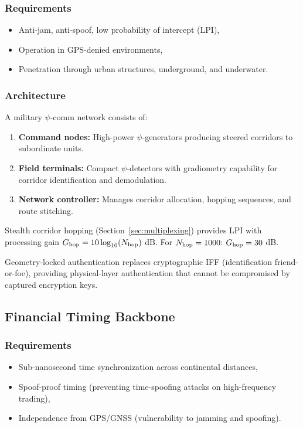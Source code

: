 \documentclass[twocolumn,superscriptaddress,prd,nofootinbib]{revtex4-2}
\begin{document}
\subsubsection{Requirements}

\begin{itemize}
\item Anti-jam, anti-spoof, low probability of intercept (LPI),
\item Operation in GPS-denied environments,
\item Penetration through urban structures, underground, and underwater.
\end{itemize}

\subsubsection{Architecture}

A military $\psi$-comm network consists of:
\begin{enumerate}
\item \textbf{Command nodes:} High-power $\psi$-generators producing
steered corridors to subordinate units.
\item \textbf{Field terminals:} Compact $\psi$-detectors with
gradiometry capability for corridor identification and demodulation.
\item \textbf{Network controller:} Manages corridor allocation, hopping
sequences, and route stitching.
\end{enumerate}

Stealth corridor hopping (Section~\ref{sec:multiplexing}) provides LPI
with processing gain $G_{\rm hop} = 10\log_{10}(N_{\rm hop})$ dB.
For $N_{\rm hop} = 1000$: $G_{\rm hop} = 30$ dB.

Geometry-locked authentication replaces cryptographic IFF
(identification friend-or-foe), providing physical-layer authentication
that cannot be compromised by captured encryption keys.

\subsection{Financial Timing Backbone}

\subsubsection{Requirements}

\begin{itemize}
\item Sub-nanosecond time synchronization across continental distances,
\item Spoof-proof timing (preventing time-spoofing attacks on
high-frequency trading),
\item Independence from GPS/GNSS (vulnerability to jamming and spoofing).
\end{itemize}
\end{document}
